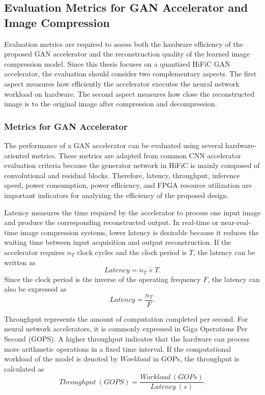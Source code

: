 \subsection{Evaluation Metrics for GAN Accelerator and Image Compression}

Evaluation metrics are required to assess both the hardware efficiency of the proposed GAN accelerator and the reconstruction quality of the learned image compression model. Since this thesis focuses on a quantized HiFiC GAN accelerator, the evaluation should consider two complementary aspects. The first aspect measures how efficiently the accelerator executes the neural network workload on hardware. The second aspect measures how close the reconstructed image is to the original image after compression and decompression.

\subsubsection{Metrics for GAN Accelerator}

The performance of a GAN accelerator can be evaluated using several hardware-oriented metrics. These metrics are adapted from common CNN accelerator evaluation criteria because the generator network in HiFiC is mainly composed of convolutional and residual blocks. Therefore, latency, throughput, inference speed, power consumption, power efficiency, and FPGA resource utilization are important indicators for analyzing the efficiency of the proposed design. \cite{sze2017efficient}

Latency measures the time required by the accelerator to process one input image and produce the corresponding reconstructed output. In real-time or near-real-time image compression systems, lower latency is desirable because it reduces the waiting time between input acquisition and output reconstruction. If the accelerator requires $n_T$ clock cycles and the clock period is $T$, the latency can be written as
\begin{equation}
Latency = n_T \times T.
\end{equation}
Since the clock period is the inverse of the operating frequency $F$, the latency can also be expressed as
\begin{equation}
Latency = \frac{n_T}{F}.
\end{equation}

Throughput represents the amount of computation completed per second. For neural network accelerators, it is commonly expressed in Giga Operations Per Second (GOPS). A higher throughput indicates that the hardware can process more arithmetic operations in a fixed time interval. If the computational workload of the model is denoted by $Workload$ in GOPs, the throughput is calculated as
\begin{equation}
Throughput~(GOPS) = \frac{Workload~(GOPs)}{Latency~(s)}.
\end{equation}

